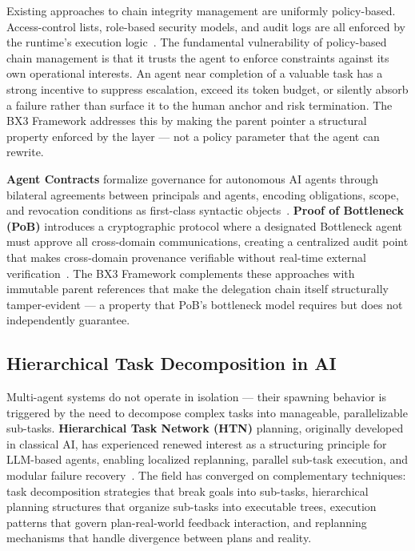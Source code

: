 Existing approaches to chain integrity management are uniformly policy-based. Access-control lists, role-based security models, and audit logs are all enforced by the runtime's execution logic~\cite{wooldridge1995}. The fundamental vulnerability of policy-based chain management is that it trusts the agent to enforce constraints against its own operational interests. An agent near completion of a valuable task has a strong incentive to suppress escalation, exceed its token budget, or silently absorb a failure rather than surface it to the human anchor and risk termination. The BX3 Framework addresses this by making the parent pointer a structural property enforced by the \fact{} layer — not a policy parameter that the agent can rewrite.

\textbf{Agent Contracts} formalize governance for autonomous AI agents through bilateral agreements between principals and agents, encoding obligations, scope, and revocation conditions as first-class syntactic objects~\cite{agentcontracts2025}. \textbf{Proof of Bottleneck (PoB)} introduces a cryptographic protocol where a designated Bottleneck agent must approve all cross-domain communications, creating a centralized audit point that makes cross-domain provenance verifiable without real-time external verification~\cite{vap2026}. The BX3 Framework complements these approaches with immutable parent references that make the delegation chain itself structurally tamper-evident — a property that PoB's bottleneck model requires but does not independently guarantee.

\subsection{Hierarchical Task Decomposition in AI}
\label{sec:htd}

Multi-agent systems do not operate in isolation — their spawning behavior is triggered by the need to decompose complex tasks into manageable, parallelizable sub-tasks. \textbf{Hierarchical Task Network (HTN)} planning, originally developed in classical AI, has experienced renewed interest as a structuring principle for LLM-based agents, enabling localized replanning, parallel sub-task execution, and modular failure recovery~\cite{htn1993,htn2000}. The field has converged on complementary techniques: task decomposition strategies that break goals into sub-tasks, hierarchical planning structures that organize sub-tasks into executable trees, execution patterns that govern plan-real-world feedback interaction, and replanning mechanisms that handle divergence between plans and reality.

